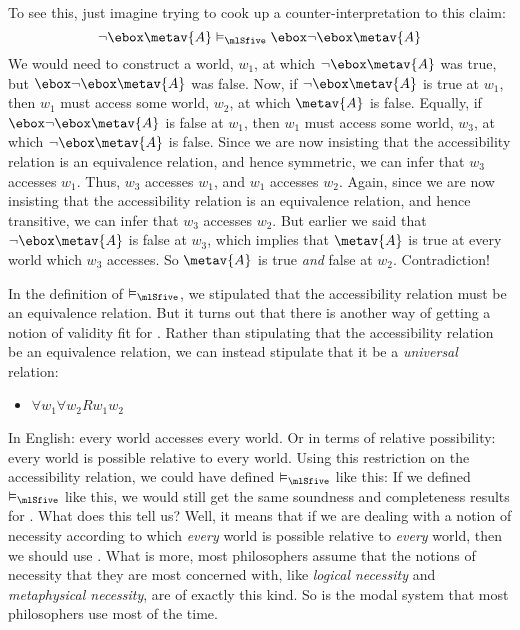 To see this, just imagine trying to cook up a counter-interpretation to this claim:
\[
	\enot\ebox\metav{A} \entails_\mlSfive  \ebox \enot\ebox \metav{A}
\]
We would need to construct a world, $w_1$, at which $\enot\ebox\metav{A}$ was true, but $\ebox \enot\ebox \metav{A}$ was false. 
Now, if $\enot\ebox\metav{A}$ is true at $w_1$, then $w_1$ must access some world, $w_2$, at which $\metav{A}$ is false. Equally, if $\ebox \enot\ebox \metav{A}$ is false at $w_1$, then $w_1$ must access some world, $w_3$, at which $\enot\ebox \metav{A}$ is false. Since we are now insisting that the accessibility relation is an equivalence relation, and hence symmetric, we can infer that $w_3$ accesses $w_1$. Thus, $w_3$ accesses $w_1$, and $w_1$ accesses $w_2$. Again, since we are now insisting that the accessibility relation is an equivalence relation, and hence transitive, we can infer that $w_3$ accesses $w_2$. But earlier we said that $\enot\ebox \metav{A}$ is false at $w_3$, which implies that $\metav{A}$ is true at every world which $w_3$ accesses. So $\metav{A}$ is true \emph{and} false at $w_2$. Contradiction!

In the definition of $\entails_\mlSfive $, we stipulated that the accessibility relation must be an equivalence relation. But it turns out that there is another way of getting a notion of validity fit for \mlSfive. Rather than stipulating that the accessibility relation be an equivalence relation, we can instead stipulate that it be a \emph{universal} relation:
\begin{itemize}
	\item $\forall w_1\forall w_2Rw_1w_2$
\end{itemize}
In English: every world accesses every world. Or in terms of relative possibility: every world is possible relative to every world. Using this restriction on the accessibility relation, we could have defined $\entails_\mlSfive $ like this:
If we defined $\entails_\mlSfive $ like this, we would still get the same soundness and completeness results for \mlSfive. What does this tell us? Well, it means that if we are dealing with a notion of necessity according to which \emph{every} world is possible relative to \emph{every} world, then we should use \mlSfive. What is more, most philosophers assume that the notions of necessity that they are most concerned with, like \emph{logical necessity} and \emph{metaphysical necessity}, are of exactly this kind. So \mlSfive{} is the modal system that most philosophers use most of the time.

